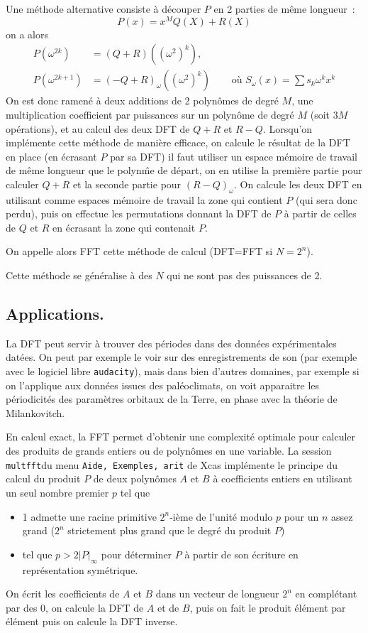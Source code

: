 \documentclass[a4paper,11pt]{article}
\begin{document}
\begin{giacjshere}
Une m\'ethode alternative consiste \`a 
d\'ecouper $P$ en 2 parties de m\^eme longueur~:
\[ P(x)=x^M Q(X) + R(X) \]
on a alors
\begin{eqnarray*}
P(\omega^{2k}) &= (Q+R) ((\omega^2)^{k}), \\
P(\omega^{2k+1}) &= (-Q +R)_\omega ((\omega^2)^k) \quad
&\mbox{ o\`u }  S_\omega(x)=\sum s_k \omega^k x^k
\end{eqnarray*}
On est donc ramen\'e \`a deux additions de 2 polyn\^omes de degr\'e $M$,
une multiplication coefficient par puissances sur un polyn\^ome de
degr\'e $M$ (soit $3M$ op\'erations),
et au calcul des deux DFT de $Q+R$ et $R-Q$. 
Lorsqu'on impl\'emente cette m\'ethode de mani\`ere efficace, 
on calcule le r\'esultat de la DFT en place (en \'ecrasant $P$ par sa DFT)
il faut utiliser un espace m\'emoire
de travail de m\^eme longueur que le polyn\^me de d\'epart, on en
utilise la premi\`ere partie pour calculer $Q+R$ et la seconde partie
pour $(R-Q)_\omega$. On calcule les deux DFT en utilisant comme
espaces m\'emoire de travail la zone qui contient $P$ (qui sera donc
perdu), puis on effectue les permutations donnant la DFT de $P$
\`a partir de celles de $Q$ et $R$ en \'ecrasant la zone qui contenait $P$.

On appelle alors FFT cette méthode de calcul (DFT=FFT si $N=2^n$).

Cette m\'ethode se g\'en\'eralise \`a des $N$ qui ne sont pas des puissances
de 2.

\subsection{Applications.}
La DFT peut servir \`a trouver des p\'eriodes dans des donn\'ees
exp\'erimentales dat\'ees. On peut par exemple le voir sur
des enregistrements de son (par exemple avec le logiciel
libre \verb|audacity|), mais dans bien d'autres
domaines, par exemple si on l'applique aux donn\'ees
issues des pal\'eoclimats, on voit apparaitre les p\'eriodicit\'es
des param\`etres orbitaux de la Terre, en phase avec la th\'eorie
de Milankovitch.

En calcul exact, la FFT permet d'obtenir une complexit\'e optimale
pour calculer des produits de grands entiers ou de polyn\^omes
en une variable. La session \verb|multfft|du menu 
\verb|Aide, Exemples, arit| de Xcas impl\'emente le principe
du calcul du produit $P$ de deux polyn\^omes $A$ et $B$ \`a coefficients entiers
en utilisant un seul nombre premier $p$ tel que 
\begin{itemize}
\item 1 admette
une racine primitive $2^n$-i\`eme de l'unit\'e modulo $p$ 
pour un $n$ assez grand ($2^n$ strictement plus grand que le degr\'e
du produit $P$) 
\item tel que $p>2|P|_\infty$ pour d\'eterminer $P$ \`a partir de son
\'ecriture en repr\'esentation sym\'etrique.
\end{itemize}
On \'ecrit les coefficients de $A$ et $B$ dans un vecteur de longueur
$2^n$ en compl\'etant par des 0, on calcule la DFT de $A$ et de $B$,
puis on fait le produit \'el\'ement par \'el\'ement puis on calcule la
DFT inverse.


\end{giacjshere}
\end{document}
